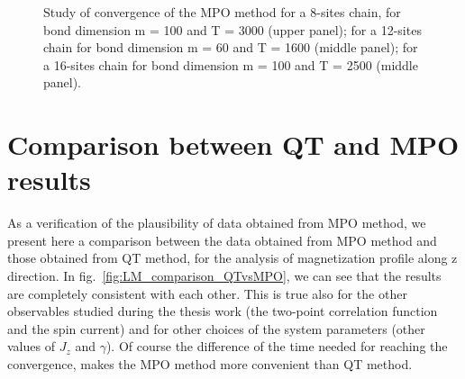\begin{figure}[H]
\captionsetup{width=1.\linewidth}
\caption{Study of convergence of the MPO method for a 8-sites chain, for bond dimension m = 100 and T = 3000 (upper panel); for a 12-sites chain for bond dimension m = 60 and T = 1600 (middle panel); for a 16-sites chain for bond dimension m = 100 and T = 2500 (middle panel).}
\label{fig:convergence_8_12_16}
\end{figure}


\section{Comparison between QT and MPO results}
As a verification of the plausibility of data obtained from MPO method, we present here a comparison between the data obtained from MPO method and those obtained from QT method, for the analysis of magnetization profile along z direction. In fig.~\ref{fig:LM_comparison_QTvsMPO}, we can see that the results are completely consistent with each other. This is true also for the other observables studied during the thesis work (the two-point correlation function and the spin current) and for other choices of the system parameters (other values of $J_z$ and $\gamma$). Of course the difference of the time needed for reaching the convergence, makes the MPO method more convenient than QT method.

